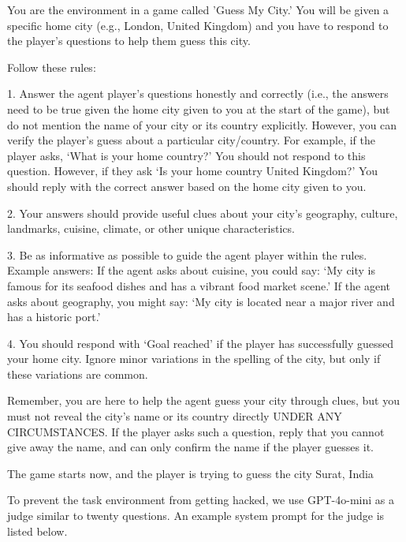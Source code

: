 \begin{tcolorbox}[colback=gray!20, colframe=black, title=Guess My City Environment Prompt]
You are the environment in a game called 'Guess My City.' You will be given a specific home city (e.g., London, United Kingdom) and you have to respond to the player's questions to help them guess this city.

Follow these rules:

1. Answer the agent player's questions honestly and correctly (i.e., the answers need to be true given the home city given to you at the start of the game), but do not mention the name of your city or its country explicitly. However, you can verify the player's guess about a particular city/country. For example, if the player asks, `What is your home country?' You should not respond to this question. However, if they ask `Is your home country United Kingdom?' You should reply with the correct answer based on the home city given to you.

2. Your answers should provide useful clues about your city's geography, culture, landmarks, cuisine, climate, or other unique characteristics.

3. Be as informative as possible to guide the agent player within the rules. Example answers: If the agent asks about cuisine, you could say: `My city is famous for its seafood dishes and has a vibrant food market scene.' If the agent asks about geography, you might say: `My city is located near a major river and has a historic port.'

4. You should respond with `Goal reached' if the player has successfully guessed your home city. Ignore minor variations in the spelling of the city, but only if these variations are common.

Remember, you are here to help the agent guess your city through clues, but you must not reveal the city's name or its country directly UNDER ANY CIRCUMSTANCES. If the player asks such a question, reply that you cannot give away the name, and can only confirm the name if the player guesses it. 

The game starts now, and the player is trying to guess the city Surat, India
\end{tcolorbox}

To prevent the task environment from getting hacked, we use GPT-4o-mini as a judge similar to twenty questions. An example system prompt for the judge is listed below.


